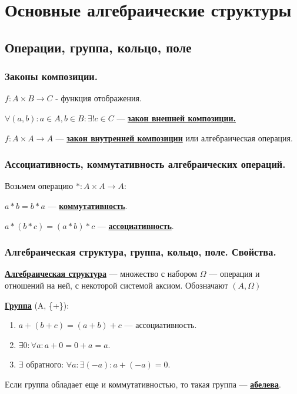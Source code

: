 \documentclass[twoside]{book}
\newcommand{\deff}[1]{\underline{\textbf{#1}}}
\begin{document}
\section{Основные алгебраические структуры}
\subsection{Операции, группа, кольцо, поле}
\subsubsection{Законы композиции.}

$f: A \times B \rightarrow C$ - функция отображения.

$\forall (a,b): a \in A, b \in B: \exists! c \in C$ --- \deff{закон внешней композиции.}

$f: A \times A \rightarrow A$ --- \deff{закон внутренней композиции} или алгебраическая операция.

\subsubsection{Ассоциативность, коммутативность алгебраических операций.}

Возьмем операцию $*: A \times A \rightarrow A$:

$a * b = b * a$ --- \deff{коммутативность}.

$a * (b *c) = (a * b) *c$ --- \deff{ассоциативность}.


\subsubsection{Алгебраическая структура, группа, кольцо, поле. Свойства.}

\deff{Алгебраическая структура} --- множество с набором $\Omega$ --- операция и отношений на ней, с некоторой системой аксиом. Обозначают $(A, \Omega)$

\deff{Группа} (A, \{+\}):

\begin{enumerate}
    \item $a+(b+c) = (a+b)+c$ --- ассоциативность.
    \item $\exists 0:\forall a: a + 0 = 0+ a =a$.
    \item $\exists$  обратного: $\forall a: \exists (-a): a+ (-a) = 0$.
\end{enumerate}

Если группа обладает еще и коммутативностью, то такая группа --- \deff{абелева}.
\end{document}
